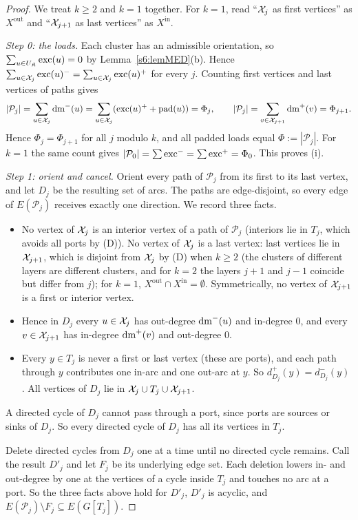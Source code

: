 \begin{proof}
We treat $k\ge2$ and $k=1$ together. For $k=1$, read ``$\mathcal{X}_j$ as first vertices'' as $X^{\mathrm{out}}$ and ``$\mathcal{X}_{j+1}$ as last vertices'' as $X^{\mathrm{in}}$.

\emph{Step 0: the loads.} Each cluster has an admissible orientation, so $\sum_{u\in U_{\mathfrak{K}}}\mathrm{exc}(u)=0$ by Lemma~\ref{s6:lemMED}(b). Hence $\sum_{u\in\mathcal{X}_j}\mathrm{exc}(u)^-=\sum_{u\in\mathcal{X}_j}\mathrm{exc}(u)^+$ for every $j$. Counting first vertices and last vertices of paths gives
\[
|\mathcal P_j|=\sum_{u\in\mathcal{X}_j}\mathrm{dm}^-(u)=\sum_{u\in\mathcal{X}_j}(\mathrm{exc}(u)^++\mathrm{pad}(u))=\Phi_j,
\qquad
|\mathcal P_j|=\sum_{v\in\mathcal{X}_{j+1}}\mathrm{dm}^+(v)=\Phi_{j+1}.
\]
Hence $\Phi_j=\Phi_{j+1}$ for all $j$ modulo $k$, and all padded loads equal $\Phi:=|\mathcal P_j|$. For $k=1$ the same count gives $|\mathcal P_0|=\sum\mathrm{exc}^-=\sum\mathrm{exc}^+=\Phi_0$. This proves (i).

\emph{Step 1: orient and cancel.} Orient every path of $\mathcal P_j$ from its first to its last vertex, and let $D_j$ be the resulting set of arcs. The paths are edge-disjoint, so every edge of $E(\mathcal P_j)$ receives exactly one direction. We record three facts.
\begin{itemize}
\item No vertex of $\mathcal{X}_j$ is an interior vertex of a path of $\mathcal P_j$ (interiors lie in $T_j$, which avoids all ports by (D)). No vertex of $\mathcal{X}_j$ is a last vertex: last vertices lie in $\mathcal{X}_{j+1}$, which is disjoint from $\mathcal{X}_j$ by (D) when $k\ge2$ (the clusters of different layers are different clusters, and for $k=2$ the layers $j+1$ and $j-1$ coincide but differ from $j$); for $k=1$, $X^{\mathrm{out}}\cap X^{\mathrm{in}}=\emptyset$. Symmetrically, no vertex of $\mathcal{X}_{j+1}$ is a first or interior vertex.
\item Hence in $D_j$ every $u\in\mathcal{X}_j$ has out-degree $\mathrm{dm}^-(u)$ and in-degree $0$, and every $v\in\mathcal{X}_{j+1}$ has in-degree $\mathrm{dm}^+(v)$ and out-degree $0$.
\item Every $y\in T_j$ is never a first or last vertex (these are ports), and each path through $y$ contributes one in-arc and one out-arc at $y$. So $d^+_{D_j}(y)=d^-_{D_j}(y)$. All vertices of $D_j$ lie in $\mathcal{X}_j\cup T_j\cup\mathcal{X}_{j+1}$.
\end{itemize}
A directed cycle of $D_j$ cannot pass through a port, since ports are sources or sinks of $D_j$. So every directed cycle of $D_j$ has all its vertices in $T_j$.

Delete directed cycles from $D_j$ one at a time until no directed cycle remains. Call the result $D'_j$ and let $F_j$ be its underlying edge set. Each deletion lowers in- and out-degree by one at the vertices of a cycle inside $T_j$ and touches no arc at a port. So the three facts above hold for $D'_j$, $D'_j$ is acyclic, and $E(\mathcal P_j)\setminus F_j\subseteq E(G[T_j])$.


\end{proof}
